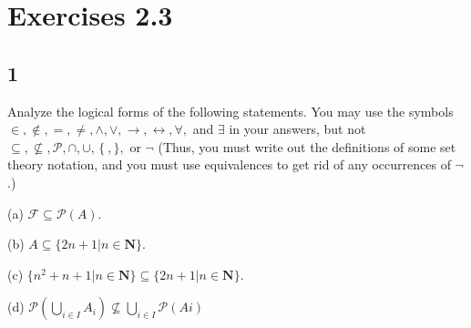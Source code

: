 \documentclass{article}
\begin{document}
\section{Exercises 2.3}
\subsection{1}
Analyze the logical forms of the following statements. You may use
the symbols $\in, \notin, =, \neq, \land, \lor, \rightarrow, \leftrightarrow, \forall,$ and $\exists$ in your answers, but not $\subseteq, \nsubseteq, \mathscr{P}, \cap, \cup, \, \{ \ ,\},$ or $\neg$ (Thus, you must write out the definitions of some set theory notation, and you must use equivalences to get rid of any occurrences of $\neg$.)

(a) $\mathcal{F} \subseteq \mathscr{P}(A)$.

(b) $A \subseteq \{ 2n + 1 | n \in \mathbf{N} \}$.

(c) $\{ n^2 + n + 1 | n \in \mathbf{N} \} \subseteq \{2n + 1 | n \in \mathbf{N} \}.$

(d) $\mathscr{P}(\bigcup_{i \in I} A_i) \nsubseteq \bigcup_{i \in I}\mathscr{P}(Ai)$
\end{document}
